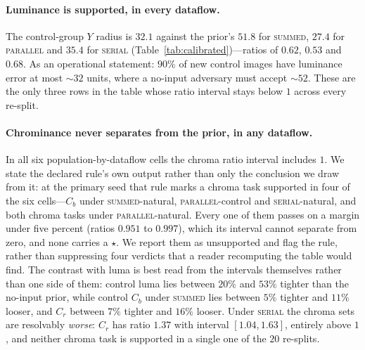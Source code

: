 \documentclass[10pt,conference]{article}
\begin{document}
\begin{table}[t]\centering\small
\caption{Calibrated per-task bounds, $\alpha=0.10$ each, $100$ calibration and $100$
assessment scenes per cell. \emph{Ratio} is the radius divided by the analytic prior's;
below $1$ means a tighter set than no input at all. \emph{Splits} is the fraction of $20$
re-splits in which the task would be supported, and $\star$ marks rows whose ratio stayed
below $1$ in \emph{every} re-split. Only those three rows support a claim.}
\label{tab:calibrated}

\end{table}

\paragraph{Luminance is supported, in every dataflow.} The control-group $Y$ radius is
$32.1$ against the prior's $51.8$ for \textsc{summed}, $27.4$ for \textsc{parallel} and
$35.4$ for \textsc{serial} (Table~\ref{tab:calibrated})---ratios of $0.62$, $0.53$ and
$0.68$. As an operational statement: $90\%$ of new control images have luminance error at
most ${\sim}32$ units, where a no-input adversary must accept ${\sim}52$. These are the
only three rows in the table whose ratio interval stays below $1$ across every re-split.

\paragraph{Chrominance never separates from the prior, in any dataflow.} In all six
population-by-dataflow cells the chroma ratio interval includes $1$. We state the
declared rule's own output rather than only the conclusion we draw from it: at the
primary seed that rule marks a chroma task supported in four of the six cells---$C_b$
under \textsc{summed}-natural, \textsc{parallel}-control and \textsc{serial}-natural,
and both chroma tasks under \textsc{parallel}-natural. Every one of them passes on a
margin under five percent (ratios $0.951$ to $0.997$), which its interval cannot
separate from zero, and none carries a $\star$. We report them as unsupported and flag the rule, rather than
suppressing four verdicts that a reader recomputing the table would find. The contrast with
luma is best read from the intervals themselves rather than one side of them: control
luma lies between $20\%$ and $53\%$ tighter than the no-input prior, while control $C_b$
under \textsc{summed} lies between $5\%$ tighter and $11\%$ looser, and $C_r$ between
$7\%$ tighter and $16\%$ looser. Under \textsc{serial} the chroma sets are resolvably
\emph{worse}: $C_r$ has ratio $1.37$ with interval $[1.04, 1.63]$, entirely above $1$,
and neither chroma task is supported in a single one of the $20$ re-splits.
\end{document}
